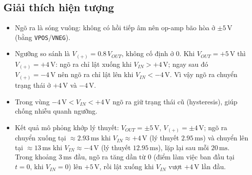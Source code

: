 \subsection{Giải thích hiện tượng}
\begin{remarkbox}
\begin{itemize}[nosep]
  \item Ngõ ra là sóng vuông: không có hồi tiếp âm nên op-amp bão hòa ở $\pm 5\,\text{V}$ (bằng \texttt{VPOS}/\texttt{VNEG}).
  \item Ngưỡng so sánh là $V_{(+)} = 0.8\,V_{OUT}$, không cố định ở $0$. Khi $V_{OUT} = +5\,\text{V}$ thì $V_{(+)} = +4\,\text{V}$: ngõ ra chỉ lật xuống khi $V_{IN} > +4\,\text{V}$; ngay sau đó $V_{(+)} = -4\,\text{V}$ nên ngõ ra chỉ lật lên khi $V_{IN} < -4\,\text{V}$. Vì vậy ngõ ra chuyển trạng thái ở $+4\,\text{V}$ và $-4\,\text{V}$.
  \item Trong vùng $-4\,\text{V} < V_{IN} < +4\,\text{V}$ ngõ ra giữ trạng thái cũ (hysteresis), giúp chống nhiễu quanh ngưỡng.
  \item Kết quả mô phỏng khớp lý thuyết: $V_{OUT} = \pm 5\,\text{V}$, $V_{(+)} = \pm 4\,\text{V}$; ngõ ra chuyển xuống tại $\approx 2.93\,\text{ms}$ khi $V_{IN} \approx +4\,\text{V}$ (lý thuyết $2.95\,\text{ms}$) và chuyển lên tại $\approx 13\,\text{ms}$ khi $V_{IN} \approx -4\,\text{V}$ (lý thuyết $12.95\,\text{ms}$), lặp lại sau mỗi $20\,\text{ms}$. Trong khoảng $3\,\text{ms}$ đầu, ngõ ra tăng dần từ $0$ (điểm làm việc ban đầu tại $t = 0$, khi $V_{IN} = 0$) lên $+5\,\text{V}$, rồi lật xuống khi $V_{IN}$ vượt $+4\,\text{V}$ lần đầu.
\end{itemize}
\end{remarkbox}
